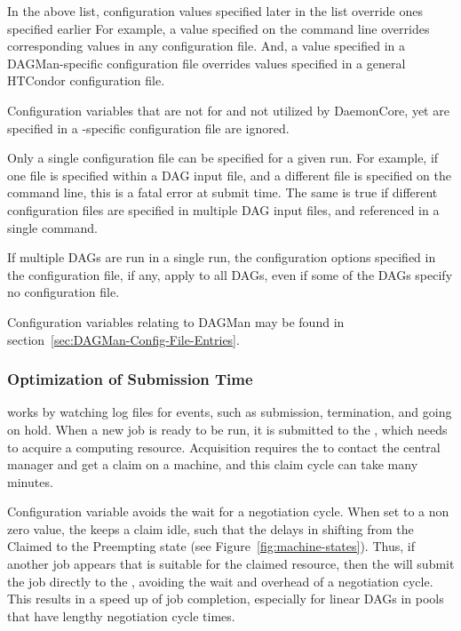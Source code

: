 In the above list, configuration values specified later in the list
override ones specified earlier
For example, a value specified on the
 command line overrides corresponding values in any
configuration file.
And, a value specified in a DAGMan-specific configuration
file overrides values specified in a general HTCondor configuration file.

Configuration variables that are not for 
and not utilized by DaemonCore, yet are specified in a
-specific configuration file are ignored.

Only a single configuration file can be specified for a given
 run.  For example, if one file is specified within a DAG
input file,
and a different file is specified on the  command
line, this is a fatal error at submit time.
The same is true if
different configuration files are specified in multiple DAG input files,
and referenced in a single  command.

If multiple DAGs are run in a single  run, the
configuration options specified in the  configuration
file, if any, apply to all DAGs, even if some of the DAGs specify no
configuration file.

Configuration variables relating to DAGMan may be found
in section~\ref{sec:DAGMan-Config-File-Entries}.

\subsubsection{\label{sec:MultipleDAGs}Optimization of Submission Time}

 works by watching log files for events, such as submission,
termination, and going on hold.
When a new job is ready to be run, it is submitted to the , 
which needs to acquire a computing resource. 
Acquisition requires the  to contact the central
manager and get a claim on a machine,
and this claim cycle can take many minutes.

Configuration variable
avoids the wait for a negotiation cycle.
When set to a non zero value, 
the  keeps a claim idle,
such that the  delays in shifting from
the Claimed to the Preempting state (see Figure~\ref{fig:machine-states}).
Thus, if another job appears that is suitable for the claimed resource,
then the  will submit the job directly to the , 
avoiding the wait and overhead of a negotiation cycle.
This results in a speed up of job completion,
especially for linear DAGs in pools that have lengthy negotiation cycle times.

